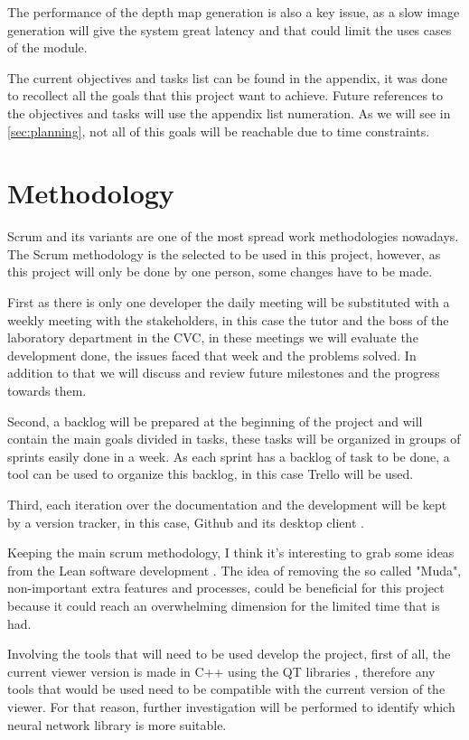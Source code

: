 \documentclass[10pt,a4paper,twocolumn,twoside]{article}
\begin{document}
	The performance of the depth map generation is also a key issue, as a slow image generation will give the system great latency and that could limit the uses cases of the module. 
	


	The current objectives and tasks list can be found in the appendix, it was done to recollect all the goals that this project want to achieve. Future references to the objectives and tasks will use the appendix list numeration. As we will see in \ref{sec:planning}, not all of this goals will be reachable due to time constraints.
	
	\section{Methodology}
	Scrum and its variants are one of the most spread work methodologies nowadays.
	The Scrum methodology is the selected to be used in this project, however, as this project will only be done by one person, some changes have to be made. 
	
	First as there is only one developer the daily meeting will be substituted with a weekly meeting with the stakeholders, in this case the tutor and the boss of the laboratory department in the CVC, in these meetings we will evaluate the development done, the issues faced that week and the problems solved. In addition to that we will discuss and review future milestones and the progress towards them.
	
	Second, a backlog will be prepared at the beginning of the project and will contain the main goals divided in tasks, these tasks will be organized in groups of sprints easily done in a week. As each sprint has a backlog of task to be done, a tool can be used to organize this backlog, in this case Trello\cite{web:trello} will be used.
	
	Third, each iteration over the documentation and the development will be kept by a version tracker, in this case, Github \cite{web:github} and its desktop client \cite{web:githubDesktop}. 
	
	Keeping the main scrum methodology, I think it's interesting to grab some ideas from the Lean software development \cite{web:leanMethod}. The idea of removing the so called "Muda", non-important extra features and processes, could be beneficial for this project because it could reach an overwhelming dimension for the limited time that is had.
	
	Involving the tools that will need to be used develop the project, first of all, the current viewer version is made in C++ using the QT libraries \cite{web:qt}, therefore any tools that would be used need to be compatible with the current version of the viewer. For that reason, further investigation will be performed to identify which neural network library is more suitable.
	
\end{document}
